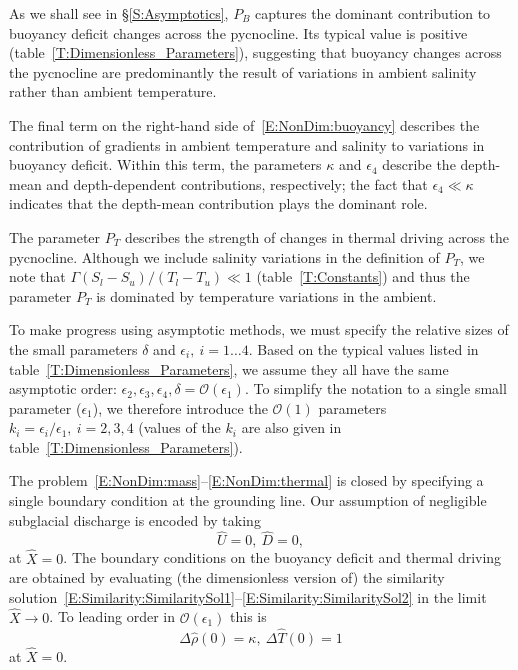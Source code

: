 \documentclass[openacc]{rsproca_new}%
\newcommand{\order}[1]{\mathcal{O}(#1)}
\newcommand{\epsone}{\epsilon_{1}} %
\newcommand{\epstwo}{\epsilon_{2}} %
\newcommand{\epsthree}{\epsilon_{3}} %
\newcommand{\epsfour}{\epsilon_{4}}
\newcommand{\Pb}{\textit{P}_B}  %
\newcommand{\lt}{\delta} %
\newcommand{\Pt}{\textit{P}_T}
\begin{document}
As we shall see in \S\ref{S:Asymptotics}, $\Pb$ captures the dominant contribution to buoyancy deficit changes across the pycnocline. Its typical value is positive (table~\ref{T:Dimensionless_Parameters}), suggesting that buoyancy changes across the pycnocline are predominantly the result of variations in ambient salinity rather than ambient temperature.

The final term on the right-hand side of~\eqref{E:NonDim:buoyancy} describes the contribution of gradients in ambient temperature and salinity to variations in buoyancy deficit. Within this term, the parameters $\kappa$ and $\epsfour$ describe the depth-mean and depth-dependent contributions, respectively; the fact that $\epsfour \ll \kappa$ indicates that the depth-mean contribution plays the dominant role.

The parameter $\Pt$ describes the strength of changes in thermal driving across the pycnocline. Although we include salinity variations in the definition of $\Pt$, we note that $\Gamma (S_l - S_u)/(T_l - T_u) \ll 1$ (table~\ref{T:Constants}) and thus the parameter $\Pt$ is dominated by temperature variations in the ambient.

To make progress using asymptotic methods, we must specify the relative sizes of the small parameters $\lt$ and $\epsilon_i, ~i = 1\dots4$. Based on the typical values listed in table~\ref{T:Dimensionless_Parameters}, we assume they all have the same asymptotic order: $\epstwo, \epsthree, \epsfour, \lt = \order{\epsone}$. To simplify the notation to a single small parameter ($\epsone$), we therefore introduce the $\order{1}$ parameters $k_i =\epsilon_i/ \epsone,~i = 2,3,4$ (values of the $k_i$ are also given in table~\ref{T:Dimensionless_Parameters}).

The problem~\eqref{E:NonDim:mass}--\eqref{E:NonDim:thermal} is closed by specifying a single boundary condition at the grounding line. Our assumption of negligible subglacial discharge is encoded by taking
\begin{equation}\label{E:NonDim:IC1}
\hat{U} =0,~\hat{D} = 0,
\end{equation}
at $\hat{X} = 0$. The boundary conditions on the buoyancy deficit and thermal driving are obtained by evaluating (the dimensionless version of) the similarity solution~\eqref{E:Similarity:SimilaritySol1}--\eqref{E:Similarity:SimilaritySol2} in the limit $\hat{X} \to 0$. To leading order in $\order{\epsone}$ this is
\begin{equation}\label{E:NonDim:IC2}
  \Delta\hat{\rho}(0) = \kappa,~\Delta \hat{T}(0) = 1  
\end{equation}
at $\hat{X} = 0$.
\end{document}
